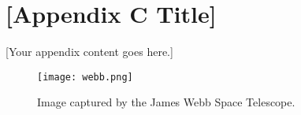 \chapter{[Appendix C Title]}
\label{app:appendixC}

[Your appendix content goes here.]

\begin{figure}[ht]
    \centering
    \texttt{[image: webb.png]}
    \caption{Image captured by the James Webb Space Telescope.}
    \label{fig:webb}
\end{figure}